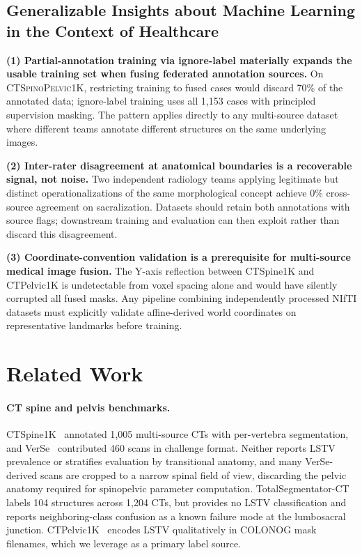 \documentclass[pmlr]{jmlr}
\newcommand{\dataset}{\textsc{CTSpinoPelvic1K}}
\begin{document}
\subsection*{Generalizable Insights about Machine Learning in the
Context of Healthcare}

\textbf{(1) Partial-annotation training via ignore-label materially
expands the usable training set when fusing federated annotation
sources.} On \dataset{}, restricting training to fused cases would
discard 70\% of the annotated data; ignore-label training uses all
1{,}153 cases with principled supervision masking. The pattern
applies directly to any multi-source dataset where different teams
annotate different structures on the same underlying images.

\textbf{(2) Inter-rater disagreement at anatomical boundaries is a
recoverable signal, not noise.}
Two independent radiology teams applying legitimate but distinct
operationalizations of the same morphological concept achieve 0\%
cross-source agreement on sacralization. Datasets should retain
both annotations with source flags; downstream training and
evaluation can then exploit rather than discard this disagreement.

\textbf{(3) Coordinate-convention validation is a prerequisite for
multi-source medical image fusion.}
The Y-axis reflection between CTSpine1K and CTPelvic1K is
undetectable from voxel spacing alone and would have silently
corrupted all fused masks. Any pipeline combining independently
processed NIfTI datasets must explicitly validate
affine-derived world coordinates on representative landmarks
before training.

\section{Related Work}
\label{sec:related}

\paragraph{CT spine and pelvis benchmarks.}
CTSpine1K~\citep{Deng2021CTSpine1K:Tomography} annotated 1{,}005 multi-source
CTs with per-vertebra segmentation, and
VerSe~\citep{Sekuboyina2020VerSe:Benchmark} contributed 460 scans in challenge
format.
Neither reports LSTV prevalence or stratifies evaluation by
transitional anatomy, and many VerSe-derived scans are cropped to a
narrow spinal field of view, discarding the pelvic anatomy required
for spinopelvic parameter computation.
TotalSegmentator-CT~\citep{Wasserthal2023TotalSegmentator:Images} labels 104
structures across 1{,}204 CTs, but provides no LSTV classification and
reports neighboring-class confusion as a known failure mode at the
lumbosacral junction.
CTPelvic1K~\citep{Liu2021DeepModels} encodes LSTV qualitatively in
COLONOG mask filenames, which we leverage as a primary label source.
\end{document}
